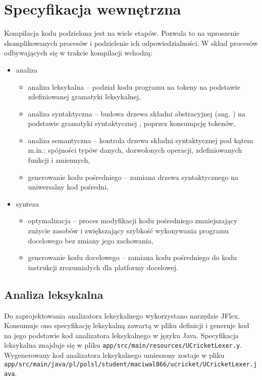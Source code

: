 \chapter{Specyfikacja wewnętrzna}
\label{ch:05}
Kompilacja kodu podzielona jest na wiele etapów. Pozwala to na uproszenie skomplikowanych procesów i podzielenie ich odpowiedzialności. W skład procesów odbywających się w trakcie kompilacji wchodzą:
\begin{itemize}
\item analiza
\begin{itemize}
\item analiza leksykalna -- podział kodu programu na tokeny na podstawie zdefiniowanej gramatyki leksykalnej,
\item analiza syntaktyczna -- budowa drzewa składni abstracyjnej (ang. ) na podstawie gramatyki syntaktycznej , poprzez konsumpcję tokenów,
\item analiza semantyczna -- kontrola drzewa składni syntaktycznej pod kątem m.in.: spójności typów danych, dozwolonych operacji, zdefiniowanych funkcji i zmiennych,
\item generowanie kodu pośredniego -- zamiana drzewa syntaktycznego na uniwersalny kod pośredni,
\end{itemize}
\item synteza
\begin{itemize}
\item optymalizacja -- proces modyfikacji kodu pośredniego zmniejszający zużycie zasobów i zwiększający szybkość wykonywania programu docelowego bez zmiany jego zachowania,
\item generowanie kodu docelowego -- zamiana kodu pośredniego do kodu instrukcji zrozumiałych dla platformy docelowej.
\end{itemize}
\end{itemize}

\section{Analiza leksykalna}
Do zaprojektowania analizatora leksykalnego wykorzystano narzędzie JFlex. Konsumuje ono specyfikację leksykalną zawartą w pliku definicji i generuje kod na jego podstawie kod analizatora leksykalnego w języku Java. Specyfikacja leksykalna znajduje się w pliku \lstinline|app/src/main/resources/UCricketLexer.y|. Wygenerowany kod analizatora leksykalnego umieszony zostaje w pliku \lstinline|app/src/main/java/pl/polsl/student/maciwal866/ucricket/UCricketLexer.java|.

